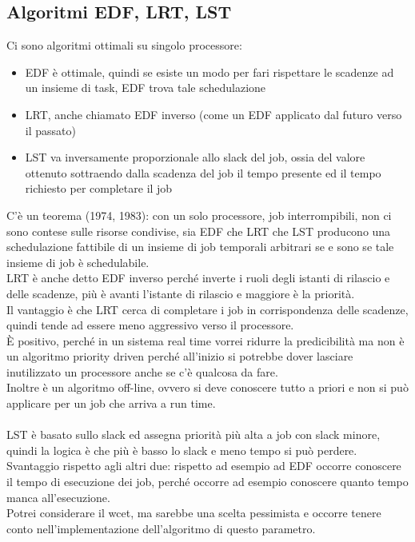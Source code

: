 \documentclass[12pt, oneside]{extbook}
\begin{document}
\subsection{Algoritmi EDF, LRT, LST}
Ci sono algoritmi ottimali su singolo processore:
\begin{itemize}
	\item EDF è ottimale, quindi se esiste un modo per fari rispettare le scadenze ad un insieme di task, EDF trova tale schedulazione
	\item LRT, anche chiamato EDF inverso (come un EDF applicato dal futuro verso il passato)
	\item LST va inversamente proporzionale allo slack del job, ossia del valore ottenuto sottraendo dalla scadenza del job il tempo presente ed il tempo richiesto per completare il job
\end{itemize}
C'è un teorema (1974, 1983): con un solo processore, job interrompibili, non ci sono contese sulle risorse condivise, sia EDF che LRT che LST producono una schedulazione fattibile di un insieme di job temporali arbitrari se e sono se tale insieme di job è schedulabile.\\
LRT è anche detto EDF inverso perché inverte i ruoli degli istanti di rilascio e delle scadenze, più è avanti l'istante di rilascio e maggiore è la priorità.\\
Il vantaggio è che LRT cerca di completare i job in corrispondenza delle scadenze, quindi tende ad essere meno aggressivo verso il processore.\\
È positivo, perché in un sistema real time vorrei ridurre la predicibilità ma non è un algoritmo priority driven perché all'inizio si potrebbe dover lasciare inutilizzato un processore anche se c'è qualcosa da fare.\\
Inoltre è un algoritmo off-line, ovvero si deve conoscere tutto a priori e non si può applicare per un job che arriva a run time.\\\\
LST è basato sullo slack ed assegna priorità più alta a job con slack minore, quindi la logica è che più è basso lo slack e meno tempo si può perdere.\\
Svantaggio rispetto agli altri due: rispetto ad esempio ad EDF occorre conoscere il tempo di esecuzione dei job, perché occorre ad esempio conoscere quanto tempo manca all'esecuzione.\\
Potrei considerare il wcet, ma sarebbe una scelta pessimista e occorre tenere conto nell'implementazione dell'algoritmo di questo parametro.\\
\end{document}
